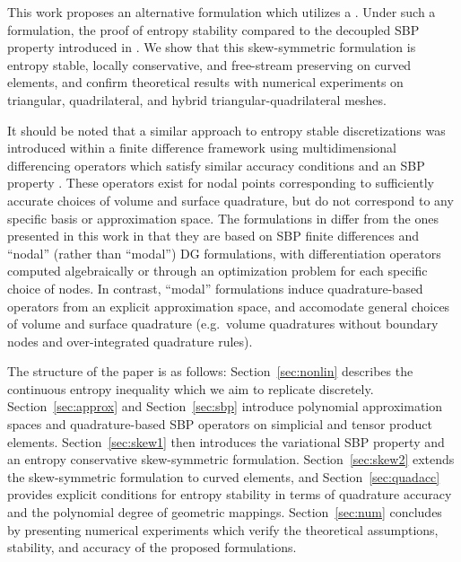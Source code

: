 \documentclass{svjour3}                     %
\renewcommand{\note}[1]{{\color{blue}{#1}}}
\begin{document}
This work proposes an alternative formulation which utilizes a \note{skew-symmetric construction of the SBP operator}.  Under such a formulation, the proof of entropy stability \note{holds under weaker quadrature rules} compared to the decoupled SBP property introduced in \cite{chan2017discretely, chan2018discretely}.  We show that this skew-symmetric formulation is entropy stable, locally conservative, and free-stream preserving on curved elements, and confirm theoretical results with numerical experiments on triangular, quadrilateral, and hybrid triangular-quadrilateral meshes.  

It should be noted that a similar approach to entropy stable discretizations was introduced within a finite difference framework \cite{chen2017entropy, crean2018entropy} using multidimensional differencing operators which satisfy similar accuracy conditions and an SBP property \cite{hicken2016multidimensional}.  These operators exist for nodal points corresponding to sufficiently accurate choices of volume and surface quadrature, but do not correspond to any specific basis or approximation space.  The formulations in \cite{chen2017entropy, crean2018entropy} differ from the ones presented in this work in that they are based on SBP finite differences and ``nodal'' (rather than ``modal'') DG formulations, with differentiation operators computed algebraically or through an optimization problem for each specific choice of nodes.  In contrast, ``modal'' formulations induce quadrature-based operators from an explicit approximation space, and accomodate general choices of volume and surface quadrature (e.g.\ volume quadratures without boundary nodes and over-integrated quadrature rules).  

The structure of the paper is as follows: Section~\ref{sec:nonlin} describes the continuous entropy inequality which we aim to replicate discretely.  Section~\ref{sec:approx} and Section~\ref{sec:sbp} introduce polynomial approximation spaces and quadrature-based SBP operators on simplicial and tensor product elements.  
Section~\ref{sec:skew1} then introduces the variational SBP property and an entropy conservative skew-symmetric formulation.  Section~\ref{sec:skew2} extends the skew-symmetric formulation to curved elements, and Section~\ref{sec:quadacc} provides explicit conditions for entropy stability in terms of quadrature accuracy and the polynomial degree of geometric mappings.  Section~\ref{sec:num} concludes by presenting numerical experiments which verify the theoretical assumptions, stability, and accuracy of the proposed formulations.
\end{document}
